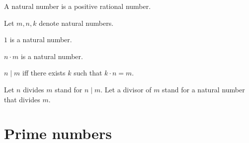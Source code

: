 \documentclass{article}
\begin{document}
  \begin{forthel}
    \begin{signature}
      A natural number is a positive rational number.
    \end{signature}

    Let $m, n, k$ denote natural numbers.

    \begin{signature}
        $1$ is a natural number.
    \end{signature}

    \begin{axiom}
      $n \cdot m$ is a natural number.
    \end{axiom}

    \begin{definition}
      $n \mid m$ iff there exists $k$ such that $k \cdot n = m$.
    \end{definition}

    Let $n$ divides $m$ stand for $n \mid m$.
    Let a divisor of $m$ stand for a natural number that divides $m$.
  \end{forthel}

  \section*{Prime numbers}
\end{document}
